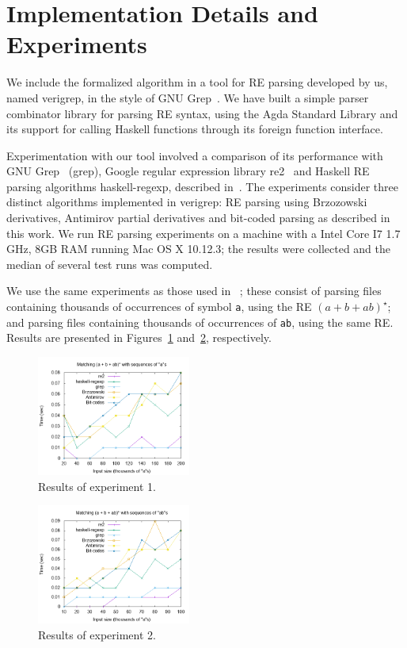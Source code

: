 \documentclass[sigconf]{acmart}
\theoremstyle{definition}
\begin{document}
\section{Implementation Details and Experiments}\label{sec:exp}

We include the formalized algorithm in a tool for RE parsing 
developed by us, named verigrep, in the
style of GNU Grep~\cite{Grep}. We have built a simple parser
combinator library for parsing RE syntax, using the Agda Standard
Library and its support for calling Haskell functions through its
foreign function interface.

Experimentation with our tool involved a comparison
of its performance with GNU Grep~\cite{Grep} (grep), Google regular
expression library re2~\cite{re2} and Haskell RE parsing algorithms
haskell-regexp, described in~\cite{Fischer2010}. The experiments consider
three distinct algorithms implemented in verigrep: RE parsing using Brzozowski 
derivatives, Antimirov partial derivatives and bit-coded parsing as described 
in this work. We run RE parsing
experiments on a machine with a Intel Core I7 1.7 GHz, 8GB RAM running
Mac OS X 10.12.3; the results were collected and the median of several
test runs was computed.

We use the same experiments as those used in ~\cite{SulzmannL14};
these consist of parsing files containing thousands of occurrences of
symbol \texttt{a}, using the RE $(a + b + ab)^\star$; and parsing
files containing thousands of occurrences of \texttt{ab}, using the
same RE. Results are presented in Figures~\ref{fig:graph1}
and~\ref{fig:graph2}, respectively.

\begin{figure}[!ht]
    \includegraphics[width=0.45\textwidth]{as.png}
   \centering
   \caption{Results of experiment 1.}
   \label{fig:graph1}
\end{figure}

\begin{figure}[!ht]
    \includegraphics[width=0.45\textwidth]{abs.png}
   \centering
   \caption{Results of experiment 2.}
   \label{fig:graph2}
\end{figure}
\end{document}
